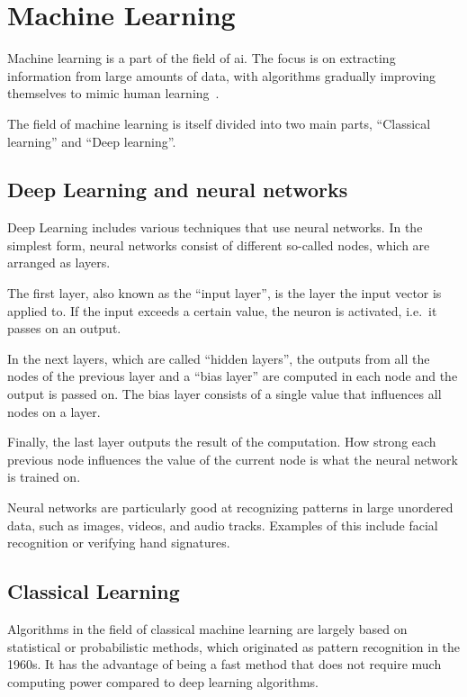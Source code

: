\section{Machine Learning}\label{sec:machine_learning}
Machine learning is a part of the field of \ac{ai}. The focus is on extracting information from large amounts of data, with algorithms gradually improving themselves to mimic human learning~\cite{what-is-ml}.

The field of machine learning is itself divided into two main parts, \enquote{Classical learning} and \enquote{Deep learning}\cite{ml-visual-explanation}.


\subsection{Deep Learning and neural networks} %

Deep Learning includes various techniques that use neural networks. In the simplest form, neural networks consist of different so-called nodes, which are arranged as layers\cite{neuralNet}.

The first layer, also known as the \enquote{input layer}, is the layer the input vector is applied to. If the input exceeds a certain value, the neuron is activated, i.e.\ it passes on an output.

In the next layers, which are called \enquote{hidden layers}, the outputs from all the nodes of the previous layer and a \enquote{bias layer} are computed in each node and the output is passed on. The bias layer consists of a single value that influences all nodes on a layer.

Finally, the last layer outputs the result of the computation. How strong each previous node influences the value of the current node is what the neural network is trained on.

Neural networks are particularly good at recognizing patterns in large unordered data, such as images, videos, and audio tracks. Examples of this include facial recognition or verifying hand signatures\cite{neuralNet-applications}.



\subsection{Classical Learning} %
Algorithms in the field of classical machine learning are largely based on statistical or probabilistic methods, which originated as pattern recognition in the 1960s. It has the advantage of being a fast method that does not require much computing power compared to deep learning algorithms\cite{neuralNet}.

